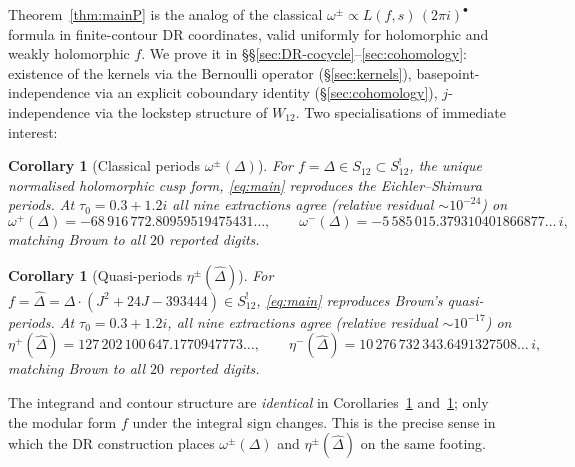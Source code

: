 \documentclass[11pt,letterpaper]{article}
\newtheorem{corollary}[theorem]{Corollary}
\newcommand{\Dhat}{\widehat{\Delta}}
\begin{document}
Theorem~\ref{thm:mainP} is the analog of the classical
$\omega^\pm \propto L(f, s)\,(2\pi i)^\bullet$ formula in finite-contour
DR coordinates, valid uniformly for holomorphic and weakly holomorphic
$f$.  We prove it in \S\S\ref{sec:DR-cocycle}--\ref{sec:cohomology}:
existence of the kernels via the Bernoulli operator
(\S\ref{sec:kernels}), basepoint-independence via an explicit coboundary
identity (\S\ref{sec:cohomology}), $j$-independence via the lockstep
structure of $W_{12}$.  Two specialisations of immediate interest:

\begin{corollary}[Classical periods $\omega^\pm(\Delta)$]\label{cor:Delta}
For $f = \Delta \in S_{12} \subset S_{12}^!$, the unique normalised
holomorphic cusp form, \eqref{eq:main} reproduces the Eichler--Shimura
periods.  At $\tau_0 = 0.3 + 1.2i$ all nine extractions agree (relative
residual $\sim 10^{-24}$) on
\[
  \omega^+(\Delta) = -68\,916\,772.80959519475431\ldots, \qquad
  \omega^-(\Delta) = -5\,585\,015.379310401866877\ldots\,i,
\]
matching Brown \cite[\S 8.3]{Brown2017} to all $20$ reported digits.
\end{corollary}

\begin{corollary}[Quasi-periods $\eta^\pm(\Dhat)$]\label{cor:Dhat}
For $f = \Dhat = \Delta\cdot(J^2 + 24J - 393444) \in S_{12}^!$,
\eqref{eq:main} reproduces Brown's quasi-periods.  At
$\tau_0 = 0.3 + 1.2i$, all nine extractions agree (relative residual
$\sim 10^{-17}$) on
\[
  \eta^+(\Dhat) = 127\,202\,100\,647.1770947773\ldots, \qquad
  \eta^-(\Dhat) = 10\,276\,732\,343.6491327508\ldots\,i,
\]
matching Brown \cite[\S 8.3]{Brown2017} to all $20$ reported digits.
\end{corollary}

The integrand and contour structure are \emph{identical} in
Corollaries~\ref{cor:Delta} and~\ref{cor:Dhat}; only the modular form
$f$ under the integral sign changes.  This is the precise sense in
which the DR construction places $\omega^\pm(\Delta)$ and
$\eta^\pm(\Dhat)$ on the same footing.
\end{document}
